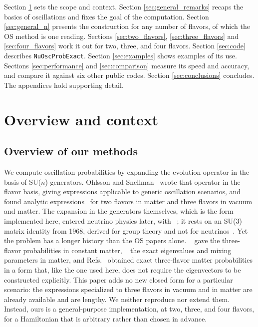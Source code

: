 \documentclass[final,5p,times,twocolumn,sort,compress]{elsarticle}
\providecommand{\Ref}{}
\newcommand{\Refs}{Refs.}
\begin{document}
Section \ref{sec:scope} sets the scope and context.  Section \ref{sec:general_remarks} recaps the basics of oscillations and fixes the goal of the computation.  Section \ref{sec:general_n} presents the construction for any number of flavors, of which the OS method is one reading. Sections \ref{sec:two_flavors}, \ref{sec:three_flavors} and \ref{sec:four_flavors} work it out for two, three, and four flavors.  Section \ref{sec:code} describes {\tt NuOscProbExact}.  Section \ref{sec:examples} shows examples of its use.  Sections \ref{sec:performance} and \ref{sec:comparison} measure its speed and accuracy, and compare it against six other public codes. Section \ref{sec:conclusions} concludes.  The appendices hold supporting detail.


\section{Overview and context}
\label{sec:scope}


\subsection{Overview of our methods}

We compute oscillation probabilities by expanding the evolution operator in the basis of SU($n$) generators.  Ohlsson and Snellman\ \cite{Ohlsson:1999xb, Ohlsson:1999um, Ohlsson:2000zz, Ohlsson:2001et} wrote that operator in the flavor basis, giving expressions applicable to generic oscillation scenarios, and found analytic expressions\ \cite{Ohlsson:1999xb} for two flavors in matter and three flavors in vacuum and matter.  The expansion in the generators themselves, which is the form implemented here, entered neutrino physics later, with \Ref\ \cite{Merfeld:2014cha}; it rests on an SU(3) matrix identity from 1968, derived for group theory and not for neutrinos\ \cite{MacFarlane:1968vc}.  Yet the problem has a longer history than the OS papers alone.  \Ref\ \cite{Barger:1980tf} gave the three-flavor probabilities in constant matter, \Ref\ \cite{Zaglauer:1988gz} the exact eigenvalues and mixing parameters in matter, and \Refs\ \cite{Kimura:2002wd, Harrison:2003fi} obtained exact three-flavor matter probabilities in a form that, like the one used here, does not require the eigenvectors to be constructed explicitly.  This paper adds no new closed form for a particular scenario: the expressions specialized to three flavors in vacuum and in matter are already available and are lengthy.  We neither reproduce nor extend them.  Instead, ours is a general-purpose implementation, at two, three, and four flavors, for a Hamiltonian that is arbitrary rather than chosen in advance.
\end{document}
